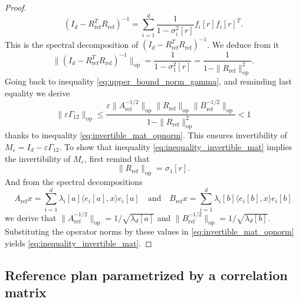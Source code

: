 \documentclass[]{article}
\DeclareMathOperator{\op}{op}
\DeclareMathOperator{\refe}{ref}
\numberwithin{equation}{section}
\theoremstyle{plain}
\begin{document}
\begin{proof}
	\begin{equation}
		(I_d - R_{\refe}^T R_{\refe})^{-1} =  \sum_{i=1}^d \frac{1}{1 - \sigma_i^2[r]}  f_i[r] f_i[r]^T.
	\end{equation}
	This is the spectral decomposition of $(I_d - R_{\refe}^T R_{\refe})^{-1}$. We deduce from it
	\begin{equation*}
	\|(I_d- R_{\refe}^T R_{\refe})^{-1}\|_{\op} = \frac{1}{1-\sigma_1^{2}[r]} = \frac{1}{1- \|R_{\refe}\|_{\op}^2}.
	\end{equation*}
	Going back to inequality \eqref{eq:upper_bound_norm_gamma}, and reminding last equality we derive
	\begin{equation*}
		\|\varepsilon\Gamma_{12}\|_{\op} \leq \frac{ \varepsilon \|A_{\refe}^{-1/2}\|_{\op} \| R_{\refe}\|_{\op} \|B_{\refe}^{-1/2}\|_{\op}}{1- \|R_{\refe}\|_{\op}^2} < 1
	\end{equation*}
thanks to inequality \eqref{eq:invertible_mat_opnorm}. This ensures invertibility of $M_{\varepsilon} = I_d - \varepsilon \Gamma_{12}$. To show that inequality \eqref{eq:inequality_invertible_mat} implies the invertibility of $M_{\varepsilon}$, first remind that
\begin{equation*}
	\| R_{\refe} \|_{\op} = \sigma_1[r].
\end{equation*}
And from the spectral decompositions 
\begin{equation*}
	A_{\refe} x = \sum_{i=1}^d \lambda_i[a] \langle e_i[a],x \rangle e_i[a] \quad \text{and} \quad B_{\refe} x = \sum_{i=1}^d \lambda_i[b] \langle e_i[b],x \rangle e_i[b]
\end{equation*}
we derive that $\|A_{\refe}^{-1/2}\|_{\op}= 1/\sqrt{\lambda_d[a]}$ and $\|B_{\refe}^{-1/2}\|_{\op}= 1/\sqrt{\lambda_d[b]}$. Substituting the operator norms by these values in \eqref{eq:invertible_mat_opnorm} yields \eqref{eq:inequality_invertible_mat}.
\end{proof}

\subsection{Reference plan parametrized by a correlation matrix}\label{sec:correlation_parameter}
\end{document}
